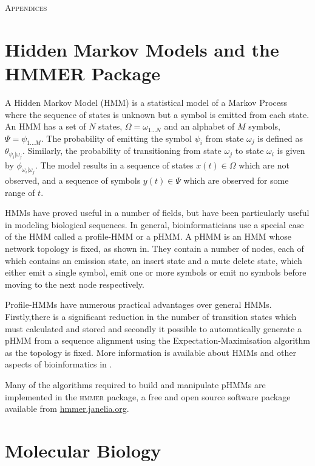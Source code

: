 \documentclass[twoside,a4paper]{article}
\begin{document}
\begin{multicols}{2}
\begin{center}
  \large\textsc{Appendices}
\end{center}

\appendix

\section{Hidden Markov Models and the HMMER Package}
\label{sec:HMMs}

A Hidden Markov Model (HMM) is a statistical model of a Markov Process where
the sequence of states is unknown but a symbol is emitted from each state. 
An HMM has a set of $N$ states, 
$\Omega = \omega_{1 \ldots N}$ and an alphabet of $M$ symbols, 
$\Psi = \psi_{1 \ldots M}$. 
The probability of emitting the symbol $\psi_i$ from state $\omega_j$ is 
defined as $\theta_{\psi_i | \omega_j}$.
Similarly, the probability of transitioning from state $\omega_j$ to state
$\omega_i$ is given by $\phi_{\omega_i | \omega_j}$.
The model results in a sequence of states $x(t) \in \Omega$ which are not
observed, and a sequence of symbols $y(t) \in \Psi$ which are observed for some
range of $t$.

HMMs have proved useful in a number of fields, but have been particularly
useful in modeling biological sequences. 
In general, bioinformaticians use a special case of the HMM called a
profile-HMM or a pHMM.
A pHMM is an HMM whose network topology is fixed, as shown in.
They contain a number of nodes, each of which contains an emission state, an
insert state and a mute delete state, which either emit a single symbol, emit
one or more symbols or emit no symbols before moving to the next node
respectively.

Profile-HMMs have numerous practical advantages over general HMMs. 
Firstly,there is a significant reduction in the number of transition states
which must calculated and stored and secondly it possible to automatically
generate a pHMM from a sequence alignment using the Expectation-Maximisation
algorithm as the topology is fixed. More information is available about HMMs
and other aspects of bioinformatics in \cite{Durbin1998}.

Many of the algorithms required to build and manipulate pHMMs are implemented
in the \textsc{hmmer}\cite{HMMERguide} package, a free and open source software 
package available from \href{http://hmmer.janelia.org/}{hmmer.janelia.org}.

\section{Molecular Biology}
\label{sec:mbio}


\end{multicols}
\end{document}
